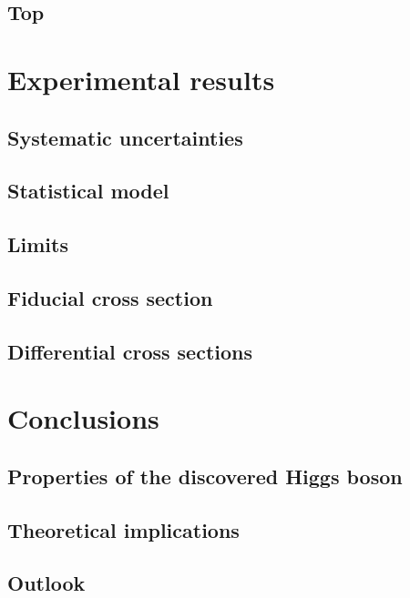 \documentclass[hyper,linkcolor=blue]{mythesis}
\begin{document}
\begin{mainmatter}
    \section{Top}
      \label{sec:top}
      
    \section{\DY}
      \label{sec:dy}
      

  \chapter{Experimental results}
    \label{chap:results}
    
    \section{Systematic uncertainties}
      \label{sec:systematics}
      
    \section{Statistical model}
      \label{sec:stats}
      
    \section{Limits}
    \section{Fiducial cross section}
      \label{sec:fiducial}
      
    \section{Differential cross sections}
      \label{sec:unfolding}
      

  \chapter{Conclusions}
    \label{chap:conclusions}
    
    \section{Properties of the discovered Higgs boson}
      \label{sec:searches}
      
    \section{Theoretical implications}
      \label{sec:implications}
      
    \section{Outlook}
      \label{sec:outlook}
      
\end{mainmatter}
\end{document}
